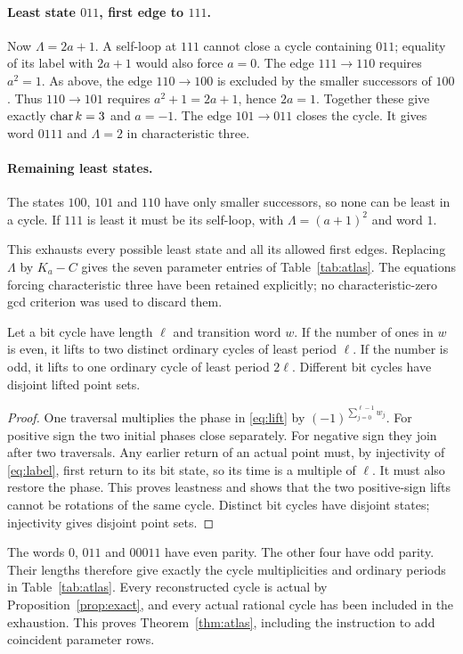 \paragraph{Least state $011$, first edge to $111$.}
Now $\Lambda=2a+1$. A self-loop at $111$ cannot close a cycle
containing $011$; equality of its label with $2a+1$ would also
force $a=0$. The edge $111\to110$ requires $a^2=1$.
As above, the edge $110\to100$ is excluded by the smaller
successors of $100$. Thus $110\to101$ requires
$a^2+1=2a+1$, hence $2a=1$. Together these give exactly
$\operatorname{char} k=3$ and $a=-1$. The edge $101\to011$ closes the cycle.
It gives word $0111$ and $\Lambda=2$ in characteristic three.

\paragraph{Remaining least states.}
The states $100$, $101$ and $110$ have only smaller successors,
so none can be least in a cycle. If $111$ is least it must be
its self-loop, with $\Lambda=(a+1)^2$ and word $1$.

This exhausts every possible least state and all its allowed first
edges. Replacing $\Lambda$ by $K_a-C$ gives the seven parameter
entries of Table~\ref{tab:atlas}. The equations forcing
characteristic three have been retained explicitly; no
characteristic-zero gcd criterion was used to discard them.

\begin{lemma}\label{lem:sign-lift}
Let a bit cycle have length $\ell$ and transition word $w$.
If the number of ones in $w$ is even, it lifts to two distinct
ordinary cycles of least period $\ell$. If the number is odd,
it lifts to one ordinary cycle of least period $2\ell$.
Different bit cycles have disjoint lifted point sets.
\end{lemma}
\begin{proof}
One traversal multiplies the phase in \eqref{eq:lift} by
$(-1)^{\sum_{j=0}^{\ell-1}w_j}$. For positive sign the two
initial phases close separately. For negative sign they join
after two traversals. Any earlier return of an actual point
must, by injectivity of \eqref{eq:label}, first return to its
bit state, so its time is a multiple of $\ell$. It must also
restore the phase. This proves leastness and shows that the
two positive-sign lifts cannot be rotations of the same cycle.
Distinct bit cycles have disjoint states; injectivity gives
disjoint point sets.
\end{proof}

The words $0$, $011$ and $00011$ have even parity. The other
four have odd parity. Their lengths therefore give exactly the
cycle multiplicities and ordinary periods in Table~\ref{tab:atlas}.
Every reconstructed cycle is actual by Proposition~\ref{prop:exact},
and every actual rational cycle has been included in the exhaustion.
This proves Theorem~\ref{thm:atlas}, including the instruction to
add coincident parameter rows.
